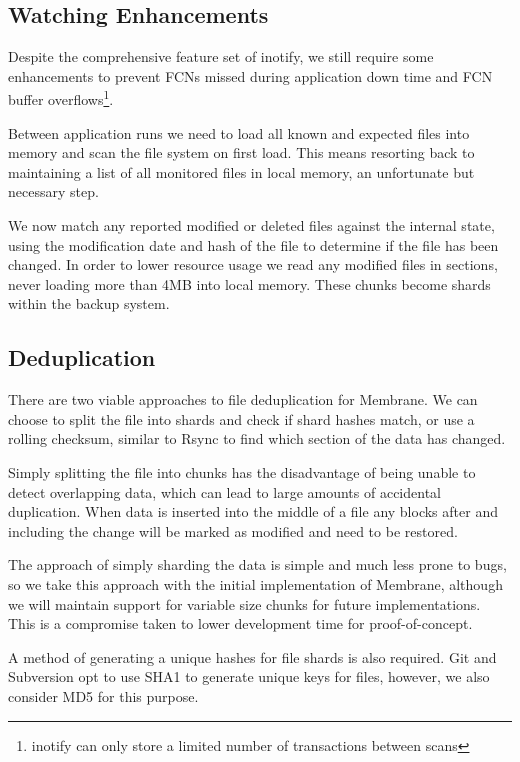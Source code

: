 \documentclass[11pt, a4paper, twoside]{report}
\begin{document}
\subsection{Watching Enhancements}

Despite the comprehensive feature set of inotify, we still require some enhancements to prevent FCNs missed during application down time and FCN buffer overflows\footnote{inotify can only store a limited number of transactions between scans}. 

Between application runs we need to load all known and expected files into memory and scan the file system on first load. This means resorting back to maintaining a list of all monitored files in local memory, an unfortunate but necessary step.

We now match any reported modified or deleted files against the internal state, using the modification date and hash of the file to determine if the file has been changed. In order to lower resource usage we read any modified files in sections, never loading more than 4MB into local memory. These chunks become shards within the backup system.

\subsection{Deduplication}

There are two viable approaches to file deduplication for Membrane. We can choose to split the file into shards and check if shard hashes match, or use a rolling checksum, similar to Rsync to find which section of the data has changed. \citep{tridgell1996rsync}

Simply splitting the file into chunks has the disadvantage of being unable to detect overlapping data, which can lead to large amounts of accidental duplication. When data is inserted into the middle of a file any blocks after and including the change will be marked as modified and need to be restored.

The approach of simply sharding the data is simple and much less prone to bugs, so we take this approach with the initial implementation of Membrane, although we will maintain support for variable size chunks for future implementations. This is a compromise taken to lower development time for proof-of-concept.

A method of generating a unique hashes for file shards is also required. Git and Subversion opt to use SHA1 \citep{torvalds2010git} to generate unique keys for files, however, we also consider MD5 for this purpose.
\end{document}
